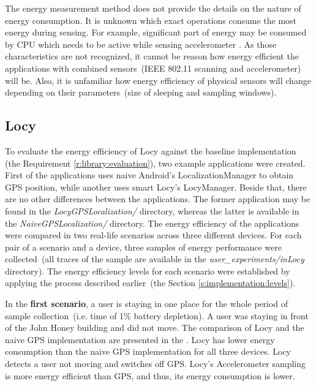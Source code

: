 The energy measurement method does not provide the details on the nature of energy consumption. It is unknown which exact operations consume the most energy during sensing. For example, significant part of energy may be consumed by CPU which needs to be active while sensing accelerometer \cite{priyantha:littlerock}. As those characteristics are not recognized, it cannot be reason how energy efficient the applications with combined sensors\ (IEEE 802.11 scanning and accelerometer) will be. Also, it is unfamiliar how energy efficiency of physical sensors will change depending on their parameters\ (size of sleeping and sampling windows).
						
\subsection{Locy}
\hspace{10pt} To evaluate the energy efficiency of Locy against the baseline implementation (the Requirement \ref{r:library:evaluation}), two example applications were created. First of the applications uses naive Android's LocalizationManager to obtain GPS position, while another uses smart Locy's LocyManager. Beside that, there are no other differences between the applications. The former application may be found in the \textit{LocyGPSLocalization/} directory, whereas the latter is available in the \textit{NaiveGPSLocalization/} directory. The energy efficiency of the applications were compared in two real-life scenarios across three different devices. For each pair of a scenario and a device, three samples of energy performance were collected\ (all traces of the sample are available in the \textit{user\_experiments/inLocy} directory). The energy efficiency levels for each scenario were established by applying the process described earlier\ (the Section \ref{s:implementation:levels}). 

In the \textbf{first scenario},  a user is staying in one place for the whole period of sample collection\ (i.e. time of 1\% battery depletion). A user was staying in front of the John Honey building and did not move. The comparison of Locy and the naive GPS implementation are presented in the .  Locy has lower energy consumption than the naive GPS implementation for all three devices. Locy detects a user not moving and switches off GPS.  Locy's Accelerometer sampling is more energy efficient than GPS, and thus, its energy consumption is lower.


